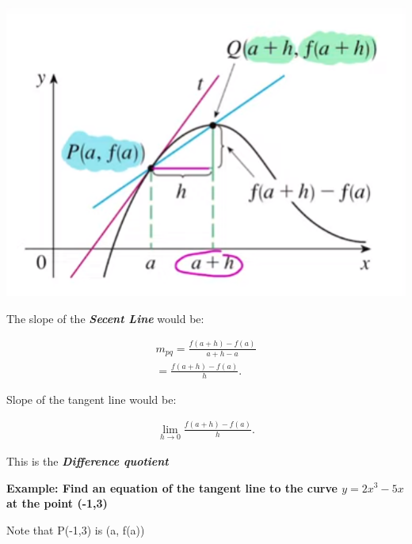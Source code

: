 \documentclass{report}
\begin{document}
        \bigbreak \noindent 
        \begin{center}
            \includegraphics[scale=0.5]{../images/20.png}
        \end{center}

        \bigbreak \noindent 
        The slope of the \textbf{\textit{Secent Line}} would be:

        \begin{align*}
            m_{pq} = \frac{f \left(a+h\right) - f \left(a\right)}{a + h - a} \\
            = \frac{f \left(a+h\right) - f(a)}{h}
        .\end{align*}

        \bigbreak \noindent 
        Slope of the tangent line would be:

        \begin{align*}
           \lim\limits_{h \to 0}{ \frac{f \left(a + h\right) - f(a)}{h}} 
        .\end{align*}

        \bigbreak \noindent 
        This is the \textbf{\textit{Difference quotient}}

        \pagebreak \bigbreak \noindent
        \begin{large}
            \textbf{Example: Find an equation of the tangent line to the curve $y = 2x^3 - 5x$ at the point (-1,3)}
        \end{large}

        \bigbreak \noindent 
        \begin{center}
            Note that P(-1,3) is (a, f(a))
        \end{center}
\end{document}
